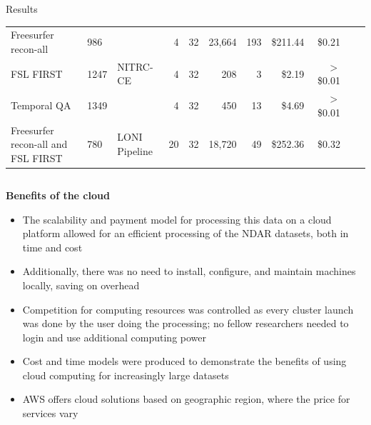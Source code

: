 \documentclass[final,hyperref={pdfpagelabels=false}]{beamer}
\begin{document}
\begin{frame}
\begin{columns}
\begin{column}{.5\textwidth}
{\begin{block}{Results}
\begin{center}
\begin{table}
\begin{tabularx}{\textwidth}{XXlrl*{6}{r}}
                        \hline
                        Freesurfer recon-all & 986 &  & 4 & 32 & 23,664 & 193 & \$211.44 & \$0.21\\
                        FSL FIRST & 1247 & NITRC-CE & 4 & 32 & 208 & 3 & \$2.19 & $>$ \$0.01\\
                        Temporal QA & 1349 &  & 4 & 32 & 450 & 13 & \$4.69 & $>$ \$0.01\\
                        \hline
                        Freesurfer recon-all and FSL FIRST & 780 & LONI Pipeline & 20 & 32 & 18,720 & 49 & \$252.36 & \$0.32\\
                    \end{tabularx}
                \end{table}
            \end{center}
          \begin{column}{.47\textwidth}
              {\bf Benefits of the cloud}
              \begin{itemize}
                  \item The scalability and payment model for processing this data on a cloud platform allowed for an efficient processing of the NDAR datasets, both in time and cost
                  \item Additionally, there was no need to install, configure, and maintain machines locally, saving on overhead
                  \item Competition for computing resources was controlled as every cluster launch was done by the user doing the processing; no fellow researchers needed to login and use additional computing power
                  \item Cost and time models were produced to demonstrate the benefits of using cloud computing for increasingly large datasets
                  \item AWS offers cloud solutions based on geographic region, where the price for services vary
              \end{itemize}

\end{column}
\end{block}}
\end{column}
\end{columns}
\end{frame}
\end{document}
